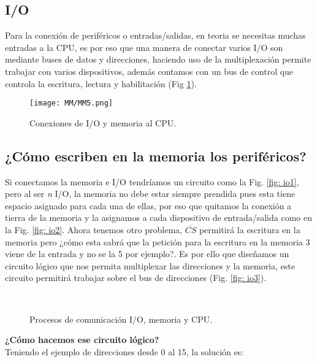 \documentclass[
	12pt, %
	fleqn, %
	a4paper, %
	oneside, %
]{LegrandOrangeBook}
\begin{document}
\subsection{I/O}
Para la conexión de periféricos o entradas/salidas, en teoria se necesitas muchas entradas a la CPU, es por eso que una manera de conectar varios I/O son mediante buses de datos y direcciones, haciendo uso de la multiplexación permite trabajar con varios dispositivos, además contamos con un bus de control que controla la escritura, lectura y habilitación (Fig \ref{fig:I/O cpy y memoria}).
\begin{figure}[]
\centering
\texttt{[image: MM/MM5.png]}
\caption{Conexiones de I/O y memoria al CPU.}
\label{fig:I/O cpy y memoria}
\end{figure}
\subsection{¿Cómo escriben en la memoria los periféricos?}
Si conectamos la memoria e I/O tendríamos un circuito como la Fig. \ref{fig: io1}, pero al ser \textit{n} I/O, la memoria no debe estar siempre prendida pues esta tiene espacio asignado para cada una de ellas, por eso que quitamos la conexión a tierra de la memoria y la asignamos a cada dispositivo de entrada/salida como en la Fig. \ref{fig: io2}. Ahora tenemos otro problema, $\overline{CS}$ permitirá la escritura en la memoria pero ¿cómo esta sabrá que la petición para la escritura en la memoria 3 viene de la entrada y no se la 5 por ejemplo?. Es por ello que diseñamos un circuito lógico que nos permita multiplexar las direcciones y la memoria, este circuito permitirá trabajar sobre el bus de direcciones (Fig. \ref{fig: io3}).\\
\begin{figure}[]
\centering
{}
\\
\caption{Procesos de comunicación I/O, memoria y CPU.}
\end{figure}
\textbf{¿Cómo hacemos ese circuito lógico?}\\
Teniendo el ejemplo de direcciones desde 0 al 15, la solución es:
\end{document}
